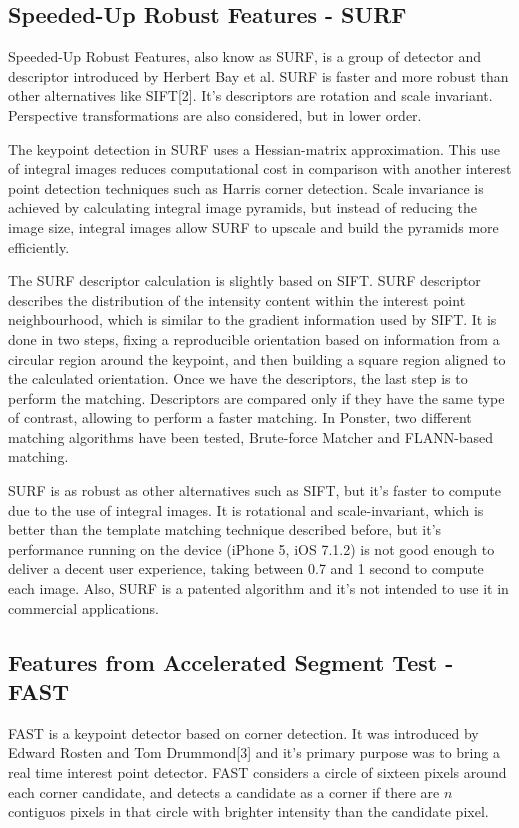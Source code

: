 \subsection{Speeded-Up Robust Features - SURF}
Speeded-Up Robust Features, also know as SURF, is a group of detector and descriptor
introduced by Herbert Bay et al. SURF is faster and more robust than other
alternatives like SIFT[2]. It's descriptors are rotation and scale invariant.
Perspective transformations are also considered, but in lower order. 

The keypoint detection in SURF uses a Hessian-matrix approximation. This use of
integral images reduces computational cost in comparison with another interest point
detection techniques such as Harris corner detection. Scale invariance is achieved
by calculating integral image pyramids, but instead of reducing the image size,
integral images allow SURF to upscale and build the pyramids more efficiently. 

The SURF descriptor calculation is slightly based on SIFT. SURF descriptor describes
the distribution of the intensity content within the interest point neighbourhood,
which is similar to the gradient information used by SIFT. It is done in two steps,
fixing a reproducible orientation based on information from a circular region around
the keypoint, and then building a square region aligned to the calculated
orientation. Once we have the descriptors, the last step is to perform the
matching. Descriptors are compared only if they have the same type of contrast,
allowing to perform a faster matching. In Ponster, two different matching algorithms
have been tested, Brute-force Matcher and FLANN-based matching.

SURF is as robust as other alternatives such as SIFT, but it's faster to compute due
to the use of integral images. It is rotational and scale-invariant, which is better
than the template matching technique described before, but it's performance running
on the device (iPhone 5, iOS 7.1.2) is not good enough to deliver a decent user
experience, taking between 0.7 and 1 second to compute each image. Also, SURF is a
patented algorithm and it's not intended to use it in commercial applications. 

\subsection{Features from Accelerated Segment Test - FAST}
FAST is a keypoint detector based on corner detection. It was introduced by
Edward Rosten and Tom Drummond[3] and it's primary purpose was to bring a real
time interest point detector. FAST considers a circle of sixteen pixels around
each corner candidate, and detects a candidate as a corner if there are $n$
contiguos pixels in that circle with brighter intensity than the candidate
pixel. %


